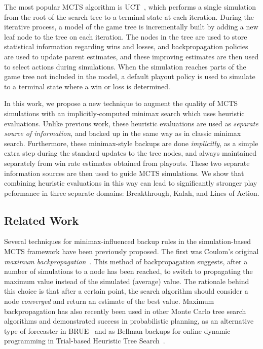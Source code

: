 \documentclass[letterpaper]{article}
\begin{document}
The most popular MCTS algorithm is UCT~\cite{Kocsis06Bandit}, 
which performs a single simulation from the root of the search tree to a terminal state at each iteration. 
During the iterative process, a model of the game tree is incrementally built by adding a 
new leaf node to the tree on each iteration. 
The nodes in the tree are used to store statistical information regarding wins and losses, and backpropagation
policies are used to update parent estimates, and these improving estimates are then used to select actions 
during simulations. 
When the simulation reaches parts of the game tree not included in the model, a default playout policy
is used to simulate to a terminal state where a win or loss is determined. 

In this work, we propose a new technique to augment the quality of MCTS simulations with  
an implicitly-computed minimax search which uses heuristic evaluations. 
Unlike previous work, these heuristic evaluations are used as {\it separate source of information}, 
and backed up in the same way as in classic minimax search. Furthermore, these minimax-style 
backups are done {\it implicitly},
as a simple extra step during the standard updates to the tree nodes, and always maintained 
separately from win rate estimates obtained from playouts. These two separate information 
sources are then used to guide MCTS simulations. 
We show that combining heuristic evaluations in this way can lead to significantly stronger play peformance in three 
separate domains: Breakthrough, Kalah, and Lines of Action. 

\subsection{Related Work}

Several techniques for minimax-influenced backup rules in the simulation-based MCTS framework have been previously proposed. 
The first was Coulom's original {\it maximum backpropagation}~\cite{Coulom06Efficient}. This method of backpropagation
suggests, after a number of simulations to a node has been reached, to switch to propagating the maximum value instead 
of the simulated (average) value. 
The rationale behind this choice is that after a certain point, the search algorithm should consider a node
{\it converged} and return an estimate of the best value. 
Maximum backpropagation has also recently been used in other Monte Carlo tree search algorithms and demonstrated success in
probabilistic planning, as an alternative type of forecaster in BRUE~\cite{Feldman13Theoretically} and as Bellman 
backups for online dynamic programming in Trial-based Heuristic Tree Search~\cite{Keller13Trial}.
\end{document}
